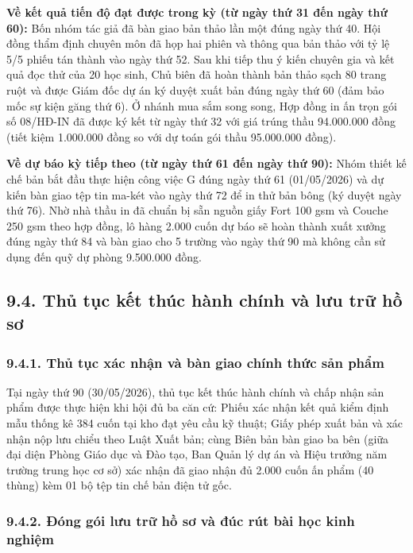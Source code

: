 \textbf{Về kết quả tiến độ đạt được trong kỳ (từ ngày thứ 31 đến ngày thứ 60):} Bốn nhóm tác giả đã bàn giao bản thảo lần một đúng ngày thứ 40. Hội đồng thẩm định chuyên môn đã họp hai phiên và thông qua bản thảo với tỷ lệ 5/5 phiếu tán thành vào ngày thứ 52. Sau khi tiếp thu ý kiến chuyên gia và kết quả đọc thử của 20 học sinh, Chủ biên đã hoàn thành bản thảo sạch 80 trang ruột và được Giám đốc dự án ký duyệt xuất bản đúng ngày thứ 60 (đảm bảo mốc sự kiện găng thứ 6). Ở nhánh mua sắm song song, Hợp đồng in ấn trọn gói số 08/HĐ-IN đã được ký kết từ ngày thứ 32 với giá trúng thầu 94.000.000 đồng (tiết kiệm 1.000.000 đồng so với dự toán gói thầu 95.000.000 đồng).

\textbf{Về dự báo kỳ tiếp theo (từ ngày thứ 61 đến ngày thứ 90):} Nhóm thiết kế chế bản bắt đầu thực hiện công việc G đúng ngày thứ 61 (01/05/2026) và dự kiến bàn giao tệp tin ma-két vào ngày thứ 72 để in thử bản bông (ký duyệt ngày thứ 76). Nhờ nhà thầu in đã chuẩn bị sẵn nguồn giấy Fort 100 gsm và Couche 250 gsm theo hợp đồng, lô hàng 2.000 cuốn dự báo sẽ hoàn thành xuất xưởng đúng ngày thứ 84 và bàn giao cho 5 trường vào ngày thứ 90 mà không cần sử dụng đến quỹ dự phòng 9.500.000 đồng.

\subsection{9.4. Thủ tục kết thúc hành chính và lưu trữ hồ sơ}

\subsubsection{9.4.1. Thủ tục xác nhận và bàn giao chính thức sản phẩm}

Tại ngày thứ 90 (30/05/2026), thủ tục kết thúc hành chính và chấp nhận sản phẩm được thực hiện khi hội đủ ba căn cứ: Phiếu xác nhận kết quả kiểm định mẫu thống kê 384 cuốn tại kho đạt yêu cầu kỹ thuật; Giấy phép xuất bản và xác nhận nộp lưu chiểu theo Luật Xuất bản; cùng Biên bản bàn giao ba bên (giữa đại diện Phòng Giáo dục và Đào tạo, Ban Quản lý dự án và Hiệu trưởng năm trường trung học cơ sở) xác nhận đã giao nhận đủ 2.000 cuốn ấn phẩm (40 thùng) kèm 01 bộ tệp tin chế bản điện tử gốc.

\subsubsection{9.4.2. Đóng gói lưu trữ hồ sơ và đúc rút bài học kinh nghiệm}

